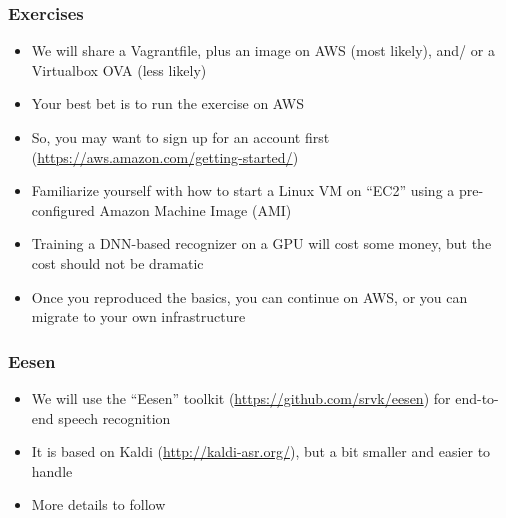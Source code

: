 \begin{frame}
  \frametitle{Exercises}
  \begin{itemize}
  \item We will share a Vagrantfile, plus an image on AWS (most likely), and/ or a Virtualbox OVA (less likely)
  \item Your best bet is to run the exercise on AWS
  \item So, you may want to sign up for an account first (\url{https://aws.amazon.com/getting-started/})
  \item Familiarize yourself with how to start a Linux VM on ``EC2'' using a pre-configured Amazon Machine Image (AMI)
  \item Training a DNN-based recognizer on a GPU will cost some money, but the cost should not be dramatic
  \item Once you reproduced the basics, you can continue on AWS, or you can migrate to your own infrastructure
  \end{itemize}
\end{frame}

\begin{frame}
  \frametitle{Eesen}
  \begin{itemize}
  \item We will use the ``Eesen'' toolkit (\url{https://github.com/srvk/eesen}) for end-to-end speech recognition
  \item It is based on Kaldi (\url{http://kaldi-asr.org/}), but a bit smaller and easier to handle
  \item {\color{Maroon} More details to follow}
  \end{itemize}
\end{frame}

